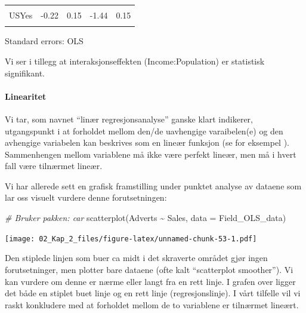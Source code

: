 \documentclass[
]{article}
\newenvironment{Shaded}{\begin{snugshade}}{\end{snugshade}}
\newcommand{\AttributeTok}[1]{\textcolor[rgb]{0.77,0.63,0.00}{#1}}
\newcommand{\CommentTok}[1]{\textcolor[rgb]{0.56,0.35,0.01}{\textit{#1}}}
\newcommand{\FunctionTok}[1]{\textcolor[rgb]{0.00,0.00,0.00}{#1}}
\newcommand{\NormalTok}[1]{#1}
\newcommand{\SpecialCharTok}[1]{\textcolor[rgb]{0.00,0.00,0.00}{#1}}
\begin{document}
\begin{table}[!h]
\begin{threeparttable}
\begin{tabular}{lrrrr}
\addlinespace
\cellcolor{gray!6}{UrbanYes} & \cellcolor{gray!6}{0.13} & \cellcolor{gray!6}{0.11} & \cellcolor{gray!6}{1.18} & \cellcolor{gray!6}{0.24}\\
USYes & -0.22 & 0.15 & -1.44 & 0.15\\
\cellcolor{gray!6}{Income:Population} & \cellcolor{gray!6}{0.00} & \cellcolor{gray!6}{0.00} & \cellcolor{gray!6}{2.30} & \cellcolor{gray!6}{0.02}\\
\bottomrule
\end{tabular}
\begin{tablenotes}
\item Standard errors: OLS
\end{tablenotes}
\end{threeparttable}
\end{table}

Vi ser i tillegg at interaksjonseffekten (Income:Population) er statistisk signifikant.

\hypertarget{linearitet}{%
\paragraph{Linearitet}\label{linearitet}}

Vi tar, som navnet ``linær regresjonsanalyse'' ganske klart indikerer, utgangspunkt i at forholdet mellom den/de uavhengige varaibelen(e) og den avhengige variabelen kan beskrives som en lineær funksjon (se for eksempel \citet{ringdalEnhetOgMangfold2007}). Sammenhengen mellom variablene må ikke være perfekt lineær, men må i hvert fall være tilnærmet lineær.

Vi har allerede sett en grafisk framstilling under punktet analyse av dataene som lar oss visuelt vurdere denne forutsetningen:

\begin{Shaded}
\begin{Highlighting}[]
\CommentTok{\# Bruker pakken: car}
\FunctionTok{scatterplot}\NormalTok{(Adverts }\SpecialCharTok{\textasciitilde{}}\NormalTok{ Sales, }\AttributeTok{data =}\NormalTok{ Field\_OLS\_data)}
\end{Highlighting}
\end{Shaded}

\texttt{[image: 02\_Kap\_2\_files/figure-latex/unnamed-chunk-53-1.pdf]}

Den stiplede linjen som buer ca midt i det skraverte området gjør ingen forutsetninger, men plotter bare dataene (ofte kalt ``scatterplot smoother''). Vi kan vurdere om denne er nærme eller langt fra en rett linje. I grafen over ligger det både en stiplet buet linje og en rett linje (regresjonslinje). I vårt tilfelle vil vi raskt konkludere med at forholdet mellom de to variablene er tilnærmet lineært.
\end{document}

